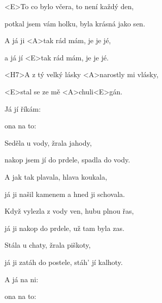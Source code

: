 

\zs
<E>To co bylo včera, to není každý den,

potkal jsem vám holku, byla krásná jako sen.
\ks

\zr
A já ji <A>tak rád mám, je je jé,

a já jí <E>tak rád mám, je je jé.

<H7>A z tý velký lásky <A>narostly mi vlásky,

<E>stal se ze mě <A>chuli<E>gán.
\kr

\zr \kr

\zs
Já jí říkám: 

ona na to: 
\ks

\zr \kr

\zs
Seděla u vody, žrala jahody,

nakop jsem jí do prdele, spadla do vody.
\ks

\zr \kr

\zs
A jak tak plavala, hlava koukala,

já ji našil kamenem a hned ji schovala.
\ks

\zr \kr

\zs
Když vylezla z vody ven, hubu plnou řas,

já ji nakop do prdele, už tam byla zas.
\ks

\zr \kr

\zs
Stála u chaty, žrala piškoty,

já ji zatáh do postele, stáh' jí kalhoty.
\ks

\zr \kr

\zs
A já na ni: 

ona na to: 
\ks

\zr \kr

\kp





